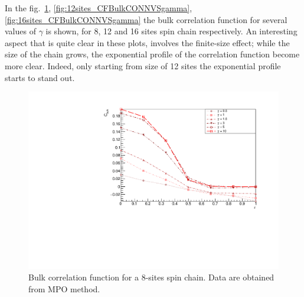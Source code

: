 



In the fig.~\ref{fig:8sites_CBulkConnVSgamma}, \ref{fig:12sites_CFBulkCONNVSgamma}, \ref{fig:16sites_CFBulkCONNVSgamma} the bulk correlation function for several values of $\gamma$ is shown, for 8, 12 and 16 sites spin chain respectively. An interesting aspect that is quite clear in these plots, involves the finite-size effect; while the size of the chain grows, the exponential profile of the correlation function become more clear. Indeed, only starting from size of 12 sites the exponential profile starts to stand out. 

\begin{figure}[H]
    \centering
    \includegraphics[scale=0.7]{Figures/8sites_CBulkConnVSgamma.pdf}
    \captionsetup{width=1.\linewidth}
    \caption{Bulk correlation function for a 8-sites spin chain. Data are obtained from MPO method.}
    \label{fig:8sites_CBulkConnVSgamma}
\end{figure}

